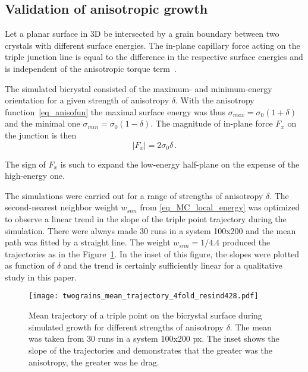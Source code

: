 \subsection{Validation of anisotropic growth}
\label{sec_appendix_MC_details}
Let a planar surface in 3D be intersected by a grain boundary between two crystals with different surface energies. The in-plane capillary force acting on the triple junction line is equal to the difference in the respective surface energies and is independent of the anisotropic torque term~\cite{Hoffman1972}.

The simulated bicrystal consisted of the maximum- and minimum-energy orientation for a given strength of anisotropy $\delta$. With the anisotropy function~\eqref{eq_anisofun} the maximal surface energy was thus $\sigma_{max}=\sigma_0(1+\delta)$ and the minimal one $\sigma_{min}=\sigma_0(1-\delta)$. The magnitude of in-plane force $F_x$ on the junction is then 
\begin{equation}
	|F_x| = 2\sigma_0\delta \,.
\end{equation}

The sign of $F_x$ is such to expand the low-energy half-plane on the expense of the high-energy one.

The simulations were carried out for a range of strengths of anisotropy $\delta$. The second-nearest neighbor weight $w_{snn}$ from \eqref{eq_MC_local_energy} was optimized to observe a linear trend in the slope of the triple point trajectory during the simulation. There were always made 30 runs in a system 100x200 and the mean path was fitted by a straight line. The weight $w_{snn}=1/4.4$ produced the trajectories as in the Figure~\ref{fig_MC_bicrystal_validation}. In the inset of this figure, the slopes were plotted as function of $\delta$ and the trend is certainly sufficiently linear for a qualitative study in this paper.

\begin{figure}
	\centering
	\texttt{[image: twograins\_mean\_trajectory\_4fold\_resind428.pdf]}
	\caption{Mean trajectory of a triple point on the bicrystal surface during simulated growth for different strengths of anisotropy $\delta$. The mean was taken from 30 runs in a system 100x200 px. The inset shows the slope of the trajectories and demonstrates that the greater was the anisotropy, the greater was he drag.}
	\label{fig_MC_bicrystal_validation}
\end{figure}

